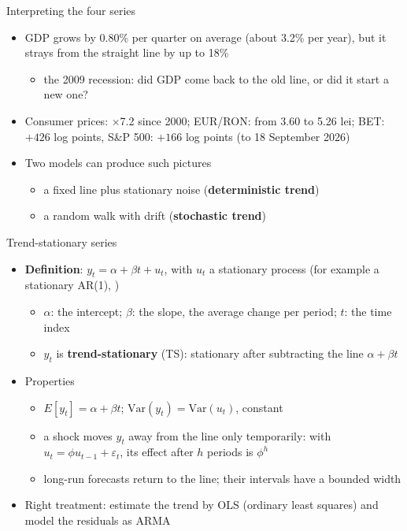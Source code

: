 \begin{frame}{Interpreting the four series}
\itemsize{\small}
\begin{itemize}
    \item GDP grows by 0.80\% per quarter on average (about 3.2\% per year), but it strays from the straight line by up to 18\%
    \begin{itemize}
        \item the 2009 recession: did GDP come back to the old line, or did it start a new one?
    \end{itemize}
    \item Consumer prices: $\times$7.2 since 2000; EUR/RON: from 3.60 to 5.26 lei; BET: $+426$ log points, S\&P 500: $+166$ log points (to 18 September 2026)
    \item Two models can produce such pictures
    \begin{itemize}
        \item a fixed line plus stationary noise (\textbf{deterministic trend})
        \item a random walk with drift (\textbf{stochastic trend})
    \end{itemize}
\end{itemize}
\end{frame}

\begin{frame}{Trend-stationary series}
\itemsize{\small}
\begin{itemize}
    \item \textbf{Definition}: $y_t = \alpha + \beta t + u_t$, with $u_t$ a stationary process (for example a stationary AR(1), )
    \begin{itemize}
        \item $\alpha$: the intercept; $\beta$: the slope, the average change per period; $t$: the time index
        \item $y_t$ is \textbf{trend-stationary} (TS): stationary after subtracting the line $\alpha + \beta t$
    \end{itemize}
    \item Properties
    \begin{itemize}
        \item $E[y_t] = \alpha + \beta t$; $\mathrm{Var}(y_t) = \mathrm{Var}(u_t)$, constant
        \item a shock moves $y_t$ away from the line only temporarily: with $u_t = \phi u_{t-1} + \varepsilon_t$, its effect after $h$ periods is $\phi^h$
        \item long-run forecasts return to the line; their intervals have a bounded width
    \end{itemize}
    \item Right treatment: estimate the trend by OLS (ordinary least squares) and model the residuals as ARMA
\end{itemize}
\end{frame}

